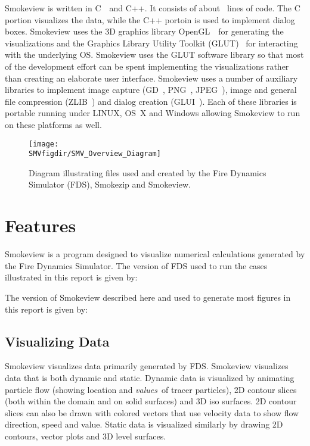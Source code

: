 \documentclass[11pt,twoside]{book}
\begin{document}
Smokeview is written in C~\cite{C:book}\ and C++\cite{Cpp17}. It consists
of about \smvlines\ lines of code. The C portion visualizes the
data, while the C++ portoin is used to implement dialog boxes.
Smokeview uses the 3D graphics
library OpenGL~\cite{OpenGLRed}\ for generating the visualizations
and the Graphics Library Utility Toolkit (GLUT)~\cite{OpenGLGlut}
for interacting with the underlying OS. Smokeview uses the GLUT
software library so that most of the development effort can be
spent implementing the visualizations rather than creating an
elaborate user interface. Smokeview uses a number of auxiliary
libraries to implement image capture (GD~\cite{BOUTELL,GDLIB},
PNG~\cite{PNGLIB}, JPEG~\cite{JPEGLIB}), image and general file
compression (ZLIB~\cite{ZLIB}) and dialog creation
(GLUI~\cite{GLUILIB}). Each of these libraries is portable running
under LINUX, OS~X and Windows allowing
Smokeview to run on these platforms as well.
\begin{figure}[bph]
\centerline{
\texttt{[image: \\SMVfigdir/SMV\_Overview\_Diagram]}}
 \caption[FDS file overview]{Diagram illustrating files used and created by the Fire Dynamics
 Simulator (FDS), Smokezip and Smokeview.}
\label{figfdsoverview}%
\end{figure}

\section{Features}

Smokeview is a program designed to visualize numerical
calculations generated by the Fire Dynamics Simulator.
The version of FDS used to run the cases illustrated  in this report
is given by:

The version of Smokeview described here and used
to generate most figures in this report is given by:


\subsection{Visualizing Data}

Smokeview visualizes data primarily generated by FDS.
Smokeview visualizes data that is both dynamic and static.  Dynamic
data is visualized by animating particle flow (showing
location and {\em values}\ of tracer particles), 2D contour
slices (both within the domain and on solid surfaces) and
3D iso surfaces.  2D contour slices can also be drawn
with colored vectors that use velocity data to show flow
direction, speed and value. Static data is visualized
similarly by drawing 2D contours, vector plots and 3D level
surfaces.
\end{document}

